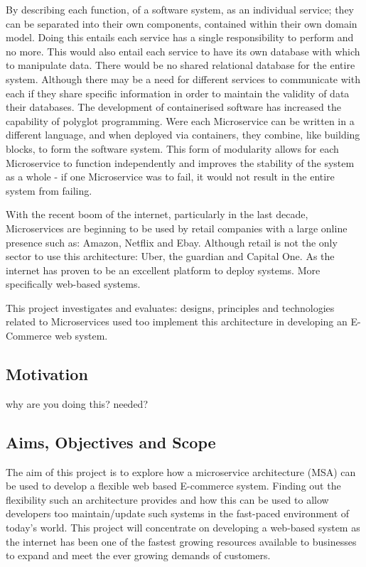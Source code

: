 	By describing each function, of a software system, as an individual service; they can be separated into their own components, contained within their own domain model. Doing this entails each service has a single responsibility to perform and no more. This would also entail each service to have its own database with which to manipulate data. There would be no shared relational database for the entire system. Although there may be a need for different services to communicate with each if they share specific information in order to maintain the validity of data their databases. The development of containerised software has increased the capability of polyglot programming. Were each Microservice can be written in a different language, and when deployed via containers, they combine, like building blocks, to form the software system. This form of modularity allows for each Microservice to function independently and improves the stability of the system as a whole - if one Microservice was to fail, it would not result in the entire system from failing. 
	
	With the recent boom of the internet, particularly in the last decade, Microservices are beginning to be used by retail companies with a large online presence such as: Amazon, Netflix and Ebay. Although retail is not the only sector to use this architecture: Uber, the guardian and Capital One. As the internet has proven to be an excellent platform to deploy systems. More specifically web-based systems.
	
	This project investigates and evaluates: designs, principles and technologies related to Microservices used too implement this architecture in developing an E-Commerce web system.
	\subsection{Motivation}
	why are you doing this? needed?
	
	\subsection{Aims, Objectives and Scope}
	The aim of this project is to explore how a microservice architecture (MSA) can be used to develop a flexible web based E-commerce system. Finding out the flexibility such an architecture provides and how this can be used to allow developers too maintain/update such systems in the fast-paced environment of today’s world. This project will concentrate on developing a web-based system as the internet has been one of the fastest growing resources available to businesses to expand and meet the ever growing demands of customers. 
	 

